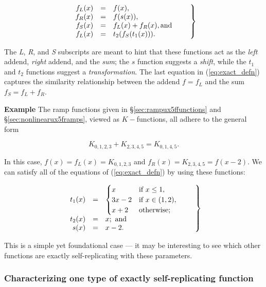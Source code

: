 \documentclass[]{article}
\begin{document}
\begin{equation}\left.\mbox{$\begin{array}{rcl}
  f_L(x) & = & f(x), \\
  f_R(x) & = & f(s(x)), \\
  f_S(x) & = & f_L(x) + f_R(x), \text{and} \\
  f_L(x) & = & t_2(f_S(t_1(x))).
\end{array}$}\quad\quad\right\rbrace\label{eq:exact_defn}\end{equation}

The \emph{L}, \emph{R}, and \emph{S} subscripts are meant to hint that
these functions act as the \emph{left} addend, \emph{right} addend, and
the \emph{sum}; the \(s\) function suggests a \emph{shift}, while the
\(t_1\) and \(t_2\) functions suggest a \emph{transformation}. The last
equation in (\ref{eq:exact_defn}) captures the similarity relationship
between the addend \(f = f_L\) and the sum \(f_S = f_L + f_R\).

\textbf{Example} The ramp functions given in
§\ref{sec:rampux5ffunctions} and §\ref{sec:nonlinearux5framps}, viewed
as \(K-\)functions, all adhere to the general form

\[K_{0,1,2,3} + K_{2,3,4,5} = K_{0,1,4,5}.\]

In this case, \(f(x) = f_L(x) = K_{0,1,2,3}\) and
\(f_R(x) = K_{2,3,4,5} = f(x-2)\). We can satisfy all of the equations
of (\ref{eq:exact_defn}) by using these functions:

\begin{equation}\left.\mbox{$\begin{array}{rcl}
t_1(x) & = &
\begin{cases}
  x              &   \text{if } x \le 1,       \\
  3x - 2         &   \text{if } x \in (1,2),   \\
  x + 2          &   \text{otherwise;}         \\
\end{cases}\\
t_2(x) & = & x; \text{ and} \\
s(x)   & = & x - 2. \\
\end{array}$}\quad\quad\right\rbrace\label{eq:s_t1_t2}\end{equation}

This is a simple yet foundational case --- it may be interesting to see
which other functions are exactly self-replicating with these
parameters.

\subsubsection{Characterizing one type of exactly self-replicating
function}\label{characterizing-one-type-of-exactly-self-replicating-function}
\end{document}

